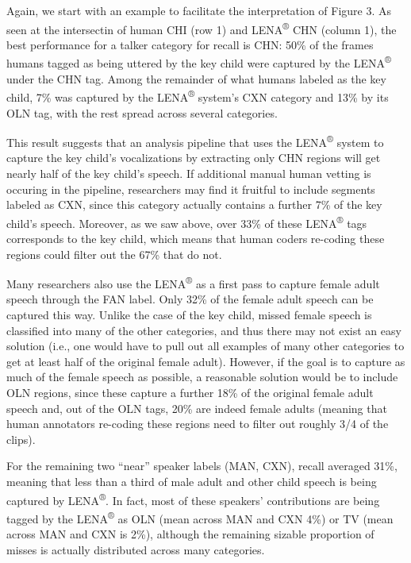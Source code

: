 \documentclass[english,table,man,floatsintext]{apa6}
\begin{document}
Again, we start with an example to facilitate the interpretation of Figure 3. As seen at the intersectin of human CHI (row 1) and LENA\textsuperscript{®} CHN (column 1), the best performance for a talker category for recall is CHN: 50\% of the frames humans tagged as being uttered by the key child were captured by the LENA\textsuperscript{®} under the CHN tag. Among the remainder of what humans labeled as the key child, 7\% was captured by the LENA\textsuperscript{®} system's CXN category and 13\% by its OLN tag, with the rest spread across several categories.

This result suggests that an analysis pipeline that uses the LENA\textsuperscript{®} system to capture the key child's vocalizations by extracting only CHN regions will get nearly half of the key child's speech. If additional manual human vetting is occuring in the pipeline, researchers may find it fruitful to include segments labeled as CXN, since this category actually contains a further 7\% of the key child's speech. Moreover, as we saw above, over 33\% of these LENA\textsuperscript{®} tags corresponds to the key child, which means that human coders re-coding these regions could filter out the 67\% that do not.

Many researchers also use the LENA\textsuperscript{®} as a first pass to capture female adult speech through the FAN label. Only 32\% of the female adult speech can be captured this way. Unlike the case of the key child, missed female speech is classified into many of the other categories, and thus there may not exist an easy solution (i.e., one would have to pull out all examples of many other categories to get at least half of the original female adult). However, if the goal is to capture as much of the female speech as possible, a reasonable solution would be to include OLN regions, since these capture a further 18\% of the original female adult speech and, out of the OLN tags, 20\% are indeed female adults (meaning that human annotators re-coding these regions need to filter out roughly 3/4 of the clips).

For the remaining two \enquote{near} speaker labels (MAN, CXN), recall averaged 31\%, meaning that less than a third of male adult and other child speech is being captured by LENA\textsuperscript{®}. In fact, most of these speakers' contributions are being tagged by the LENA\textsuperscript{®} as OLN (mean across MAN and CXN 4\%) or TV (mean across MAN and CXN is 2\%), although the remaining sizable proportion of misses is actually distributed across many categories.
\end{document}
